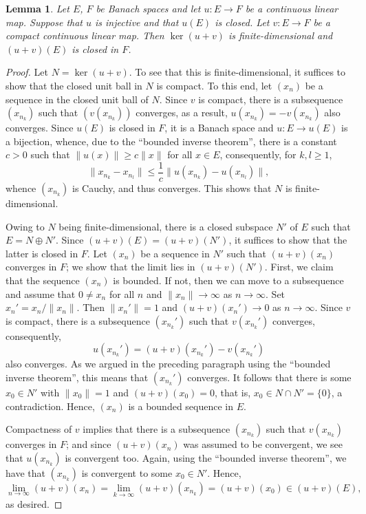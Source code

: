 \documentclass[10pt]{article}
\theoremstyle{thmstyle}
\newtheorem{lemma}[theorem]{Lemma}
\theoremstyle{defstyle}
\renewcommand{\le}{\leqslant}
\renewcommand{\ge}{\geqslant}
\begin{document}
\begin{lemma}
    Let $E$, $F$ be Banach spaces and let $u: E\to F$ be a continuous linear map. Suppose that $u$ is injective and that $u(E)$ is closed. Let $v: E\to F$ be a compact continuous linear map. Then $\ker(u + v)$ is finite-dimensional and $(u + v)(E)$ is closed in $F$.
\end{lemma}
\begin{proof}
    Let $N = \ker(u + v)$. To see that this is finite-dimensional, it suffices to show that the closed unit ball in $N$ is compact. To this end, let $(x_n)$ be a sequence in the closed unit ball of $N$. Since $v$ is compact, there is a subsequence $(x_{n_k})$ such that $\left(v(x_{n_k})\right)$ converges, as a result, $u(x_{n_k}) = -v(x_{n_k})$ also converges. Since $u(E)$ is closed in $F$, it is a Banach space and $u: E\to u(E)$ is a bijection, whence, due to the ``bounded inverse theorem'', there is a constant $c > 0$ such that $\|u(x)\|\ge c\|x\|$ for all $x\in E$, consequently, for $k,l\ge 1$, 
    \begin{equation*}
        \|x_{n_k} - x_{n_l}\|\le\frac{1}{c}\|u(x_{n_k}) - u(x_{n_l})\|,
    \end{equation*}
    whence $(x_{n_k})$ is Cauchy, and thus converges. This shows that $N$ is finite-dimensional.

    Owing to $N$ being finite-dimensional, there is a closed subspace $N'$ of $E$ such that $E = N\oplus N'$. Since $(u + v)(E) = (u + v)(N')$, it suffices to show that the latter is closed in $F$. Let $(x_n)$ be a sequence in $N'$ such that $(u + v)(x_n)$ converges in $F$; we show that the limit lies in $(u + v)(N')$. First, we claim that the sequence $(x_n)$ is bounded. If not, then we can move to a subsequence and assume that $0\ne x_n$ for all $n$ and $\|x_n\|\to\infty$ as $n\to\infty$. Set $x_n' = x_n/\|x_n\|$. Then $\|x_n'\| = 1$ and $(u + v)(x_n')\to 0$ as $n\to\infty$. Since $v$ is compact, there is a subsequence $(x_{n_k}')$ such that $v(x_{n_k}')$ converges, consequently, 
    \begin{equation*}
        u(x_{n_k}') = (u + v)(x_{n_k}') - v(x_{n_k}')
    \end{equation*}
    also converges. As we argued in the preceding paragraph using the ``bounded inverse theorem'', this means that $(x_{n_k}')$ converges. It follows that there is some $x_0\in N'$ with $\|x_0\| = 1$ and $(u + v)(x_0) = 0$, that is, $x_0\in N\cap N' = \{0\}$, a contradiction. Hence, $(x_n)$ is a bounded sequence in $E$.

    Compactness of $v$ implies that there is a subsequence $(x_{n_k})$ such that $v(x_{n_k})$ converges in $F$; and since $(u + v)(x_n)$ was assumed to be convergent, we see that $u(x_{n_k})$ is convergent too. Again, using the ``bounded inverse theorem'', we have that $(x_{n_k})$ is convergent to some $x_0\in N'$. Hence, 
    \begin{equation*}
        \lim_{n\to\infty} (u + v)(x_n) = \lim_{k\to\infty}(u + v)(x_{n_k}) = (u + v)(x_0)\in (u + v)(E),
    \end{equation*}
    as desired.
\end{proof}
\end{document}
